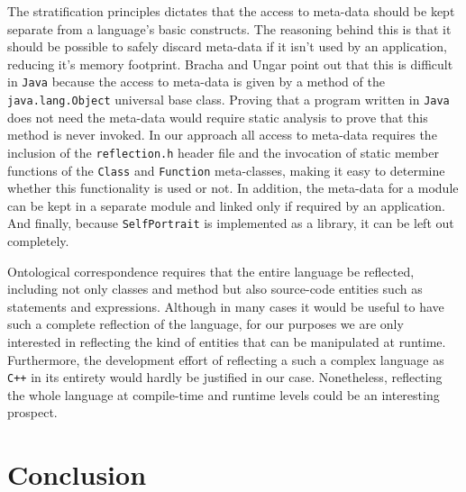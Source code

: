 The stratification principles dictates that the access to meta-data should be kept separate from a language's basic constructs. The reasoning behind this
is that it should be possible to safely discard meta-data if it isn't used by an application, reducing it's memory footprint. Bracha and Ungar point out
that this is difficult in \texttt{Java} because the access to meta-data is given by a method of the \texttt{java.lang.Object} universal base class.
Proving that a program written in \texttt{Java} does not need the meta-data would require static analysis to prove that this method is never invoked.
In our approach all access to meta-data requires the inclusion of the \texttt{reflection.h} header file and the invocation of static member functions
of the \texttt{Class} and \texttt{Function} meta-classes, making it easy to determine whether this functionality is used or not. In addition,
the meta-data for a module can be kept in a separate module and linked only if required by an application. And finally, because \texttt{SelfPortrait} is
implemented as a library, it can be left out completely.

Ontological correspondence requires that the entire language be reflected, including not only classes and method but also source-code entities such
as statements and expressions. Although in many cases it would be useful to have such a complete reflection of the language, for our purposes we
are only interested in reflecting the kind of entities that can be manipulated at runtime. Furthermore, the development effort of reflecting a such a
complex language as \texttt{C++} in its entirety would hardly be justified in our case. Nonetheless, reflecting the whole language at compile-time
and runtime levels could be an interesting prospect.




\section{Conclusion}
\label{conclusion}

